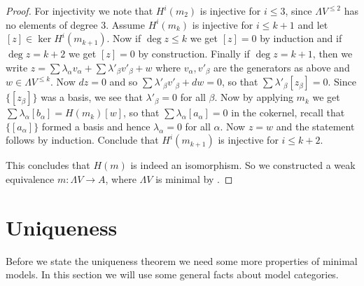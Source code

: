 \begin{proof}
	For injectivity we note that $H^i(m_2)$ is injective for $i \leq 3$, since $\Lambda V^{\leq 2}$ has no elements of degree $3$. Assume $H^i(m_k)$ is injective for $i \leq k+1$ and let $[z] \in \ker H^i(m_{k+1})$. Now if $\deg{z} \leq k$ we get $[z] = 0$ by induction and if $\deg{z} = k+2$ we get $[z] = 0$ by construction. Finally if $\deg{z} = k+1$, then we write $z = \sum \lambda_\alpha v_\alpha + \sum \lambda'_\beta v'_\beta + w$ where $v_\alpha, v'_\beta$ are the generators as above and $w \in \Lambda V^{\leq k}$. Now $d z = 0$ and so $\sum \lambda'_\beta v'_\beta + dw = 0$, so that $\sum \lambda'_\beta [z_\beta] = 0$. Since $\{ [z_\beta] \}$ was a basis, we see that $\lambda'_\beta = 0$ for all $\beta$. Now by applying $m_k$ we get $\sum \lambda_\alpha [b_\alpha] = H(m_k)[w]$, so that $\sum \lambda_\alpha [a_\alpha] = 0$ in the cokernel, recall that $\{ [a_\alpha] \}$ formed a basis and hence $\lambda_\alpha = 0$ for all $\alpha$. Now $z = w$ and the statement follows by induction. Conclude that $H^i(m_{k+1})$ is injective for $i \leq k+2$.

	This concludes that $H(m)$ is indeed an isomorphism. So we constructed a weak equivalence $m: \Lambda V \to A$, where $\Lambda V$ is minimal by .
\end{proof}


\section{Uniqueness}

Before we state the uniqueness theorem we need some more properties of minimal models. In this section we will use some general facts about model categories.

